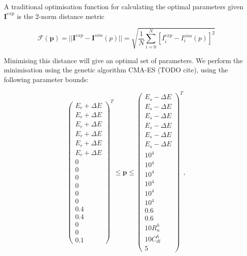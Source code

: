 \documentclass[a4paper, 12pt]{article}
\begin{document}
A traditional optimisation function for calculating the optimal parameters given
$\mathbf{I}^{exp}$ is the 2-norm distance metric

\begin{equation}
    \mathcal{F}(\mathbf{p}) = ||\mathbf{I}^{exp}-\mathbf{I}^{sim}(p)|| = \sqrt{\frac{1}{N}\sum_{i=0}^{N} [I^{exp}_i-I^{sim}_i(p)]^2}
\end{equation}

Minimising this distance will give an optimal set of parameters. We perform the
minimisation using the genetic algorithm CMA-ES (TODO cite), using the
following parameter bounds:

\begin{equation}\label{eq:bounds}
    \begin{pmatrix}
        E_{r}+\Delta E \\
        E_{r}+\Delta E \\
        E_{r}+\Delta E \\
        E_{r}+\Delta E \\
        E_{r}+\Delta E \\
        E_{r}+\Delta E \\
        0 \\
        0 \\
        0 \\
        0 \\
        0 \\
        0 \\
        0.4 \\
        0.4 \\
        0 \\
        0 \\
        0.1
    \end{pmatrix}^T
    \le \mathbf{p} \le
    \begin{pmatrix}
        E_{s}-\Delta E \\
        E_{s}-\Delta E \\
        E_{s}-\Delta E \\
        E_{s}-\Delta E \\
        E_{s}-\Delta E \\
        E_{s}-\Delta E \\
        10^4 \\
        10^4 \\
        10^4 \\
        10^4 \\
        10^4 \\
        10^4 \\
        0.6 \\
        0.6 \\
        10 R_u^h \\
        10 C_{dl}^h\\
        5
    \end{pmatrix}^T,
\end{equation}
\end{document}
